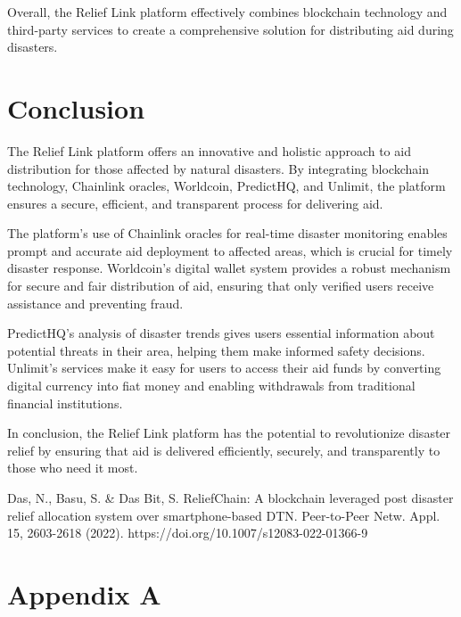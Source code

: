 \documentclass[conference]{IEEEtran}
\begin{document}
Overall, the Relief Link platform effectively combines blockchain technology and third-party services to create a comprehensive solution for distributing aid during disasters.

\section{Conclusion}
The Relief Link platform offers an innovative and holistic approach to aid distribution for those affected by natural disasters. By integrating blockchain technology, Chainlink oracles, Worldcoin, PredictHQ, and Unlimit, the platform ensures a secure, efficient, and transparent process for delivering aid.

The platform's use of Chainlink oracles for real-time disaster monitoring enables prompt and accurate aid deployment to affected areas, which is crucial for timely disaster response. Worldcoin's digital wallet system provides a robust mechanism for secure and fair distribution of aid, ensuring that only verified users receive assistance and preventing fraud.

PredictHQ's analysis of disaster trends gives users essential information about potential threats in their area, helping them make informed safety decisions. Unlimit's services make it easy for users to access their aid funds by converting digital currency into fiat money and enabling withdrawals from traditional financial institutions.

In conclusion, the Relief Link platform has the potential to revolutionize disaster relief by ensuring that aid is delivered efficiently, securely, and transparently to those who need it most.


\begin{thebibliography}{00}
     Das, N., Basu, S. \& Das Bit, S. ReliefChain: A blockchain leveraged post disaster relief allocation system over smartphone-based DTN. Peer-to-Peer Netw. Appl. 15, 2603-2618 (2022). https://doi.org/10.1007/s12083-022-01366-9
\end{thebibliography}

\appendix
\section{Appendix A}
\end{document}
